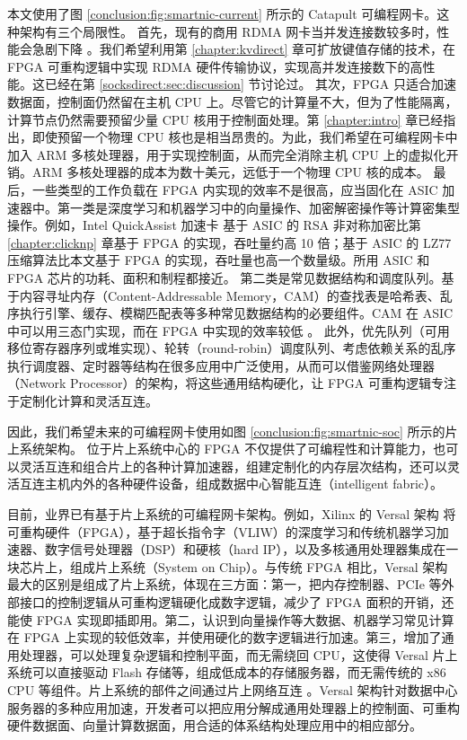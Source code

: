 本文使用了图 \ref{conclusion:fig:smartnic-current} 所示的 Catapult 可编程网卡。这种架构有三个局限性。
首先，现有的商用 RDMA 网卡当并发连接数较多时，性能会急剧下降 \cite{mprdma}。我们希望利用第 \ref{chapter:kvdirect} 章可扩放键值存储的技术，在 FPGA 可重构逻辑中实现 RDMA 硬件传输协议，实现高并发连接数下的高性能。这已经在第 \ref{socksdirect:sec:discussion} 节讨论过。
其次，FPGA 只适合加速数据面，控制面仍然留在主机 CPU 上。尽管它的计算量不大，但为了性能隔离，计算节点仍然需要预留少量 CPU 核用于控制面处理。第 \ref{chapter:intro} 章已经指出，即使预留一个物理 CPU 核也是相当昂贵的。为此，我们希望在可编程网卡中加入 ARM 多核处理器，用于实现控制面，从而完全消除主机 CPU 上的虚拟化开销。ARM 多核处理器的成本为数十美元，远低于一个物理 CPU 核的成本。
最后，一些类型的工作负载在 FPGA 内实现的效率不是很高，应当固化在 ASIC 加速器中。第一类是深度学习和机器学习中的向量操作、加密解密操作等计算密集型操作。例如，Intel QuickAssist 加速卡 \cite{intel-qat} 基于 ASIC 的 RSA 非对称加密比第 \ref{chapter:clicknp} 章基于 FPGA 的实现，吞吐量约高 10 倍；基于 ASIC 的 LZ77 压缩算法比本文基于 FPGA 的实现，吞吐量也高一个数量级。所用 ASIC 和 FPGA 芯片的功耗、面积和制程都接近。
第二类是常见数据结构和调度队列。基于内容寻址内存（Content-Addressable Memory，CAM）的查找表是哈希表、乱序执行引擎、缓存、模糊匹配表等多种常见数据结构的必要组件。CAM 在 ASIC 中可以用三态门实现，而在 FPGA 中实现的效率较低 \cite{wong2011comparing}。
此外，优先队列（可用移位寄存器序列或堆实现）、轮转（round-robin）调度队列、考虑依赖关系的乱序执行调度器、定时器等结构在很多应用中广泛使用，从而可以借鉴网络处理器（Network Processor）的架构，将这些通用结构硬化，让 FPGA 可重构逻辑专注于定制化计算和灵活互连。

因此，我们希望未来的可编程网卡使用如图 \ref{conclusion:fig:smartnic-soc} 所示的片上系统架构。
位于片上系统中心的 FPGA 不仅提供了可编程性和计算能力，也可以灵活互连和组合片上的各种计算加速器，组建定制化的内存层次结构，还可以灵活互连主机内外的各种硬件设备，组成数据中心智能互连（intelligent fabric）。

目前，业界已有基于片上系统的可编程网卡架构。例如，Xilinx 的 Versal 架构 \cite{vissers2018keynote,vissers2019versal,gaide2019xilinx} 将可重构硬件（FPGA），基于超长指令字（VLIW）的深度学习和传统机器学习加速器、数字信号处理器（DSP）和硬核（hard IP），以及多核通用处理器集成在一块芯片上，组成片上系统（System on Chip）。与传统 FPGA 相比，Versal 架构最大的区别是组成了片上系统，体现在三方面：第一，把内存控制器、PCIe 等外部接口的控制逻辑从可重构逻辑硬化成数字逻辑，减少了 FPGA 面积的开销，还能使 FPGA 实现即插即用。第二，认识到向量操作等大数据、机器学习常见计算在 FPGA 上实现的较低效率，并使用硬化的数字逻辑进行加速。第三，增加了通用处理器，可以处理复杂逻辑和控制平面，而无需绕回 CPU，这使得 Versal 片上系统可以直接驱动 Flash 存储等，组成低成本的存储服务器，而无需传统的 x86 CPU 等组件。片上系统的部件之间通过片上网络互连 \cite{swarbrick2019network,gaide2019xilinx}。Versal 架构针对数据中心服务器的多种应用加速，开发者可以把应用分解成通用处理器上的控制面、可重构硬件数据面、向量计算数据面，用合适的体系结构处理应用中的相应部分。




